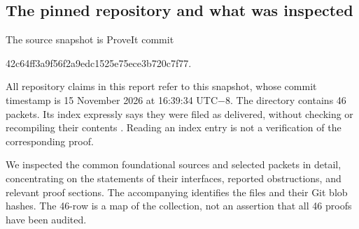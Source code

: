 \subsection{The pinned repository and what was inspected}

The source snapshot is ProveIt commit
\begin{center}\small\ttfamily
42c64ff3a9f56f2a9edc1525e75ece3b720c7f77.
\end{center}
All repository claims in this report refer to this snapshot, whose commit
timestamp is 15 November 2026 at 16:39:34 UTC$-8$.  The directory
 contains 46 packets.
Its index expressly says they were filed as delivered, without checking or
recompiling their contents \cite{repoIndex}.  Reading an index entry is not
a verification of the corresponding proof.

We inspected the common foundational sources and selected packets in
detail, concentrating on the statements of their interfaces, reported
obstructions, and relevant proof sections.  The accompanying
 identifies the files and their Git
blob hashes.  The 46-row  is a map of
the collection, not an assertion that all 46 proofs have been audited.

